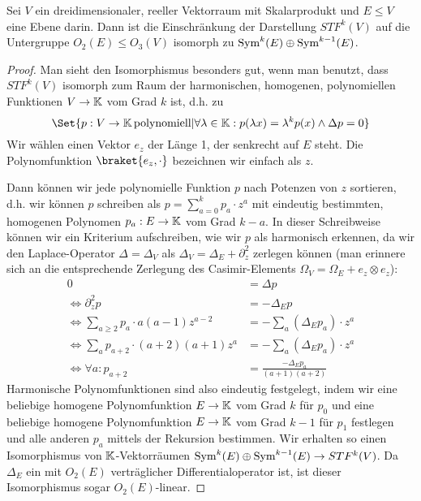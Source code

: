 
\begin{lemma}
Sei $V$ ein dreidimensionaler, reeller Vektorraum mit Skalarprodukt und $E\leq V$ eine Ebene darin. Dann ist die Einschränkung der Darstellung $STF^k(V)$ auf die Untergruppe $O_2(E) \leq O_3(V)$ isomorph zu $\operatorname{Sym}^k(E) \oplus \operatorname{Sym}^{k-1}(E)$.
\end{lemma}
\begin{proof}
Man sieht den Isomorphismus besonders gut, wenn man benutzt, dass $STF^k(V)$ isomorph zum Raum der harmonischen, homogenen, polynomiellen Funktionen $V\to\mathbb{K}$ vom Grad $k$ ist, d.h. zu
\[\Set{p: V\to\IK \,\text{polynomiell} | \forall\lambda\in\IK: p(\lambda x) = \lambda^k p(x) \wedge \Delta p = 0}\]
Wir wählen einen Vektor $e_z$ der Länge 1, der senkrecht auf $E$ steht. Die Polynomfunktion $\braket{e_z,\cdot}$ bezeichnen wir einfach als $z$.

Dann können wir jede polynomielle Funktion $p$ nach Potenzen von $z$ sortieren, d.h. wir können $p$ schreiben als $p = \sum_{a=0}^k p_a \cdot z^a$ mit eindeutig bestimmten, homogenen Polynomen $p_a: E\to\mathbb{K}$ vom Grad $k-a$. In dieser Schreibweise können wir ein Kriterium aufschreiben, wie wir $p$ als harmonisch erkennen, da wir den Laplace-Operator $\Delta=\Delta_V$ als $\Delta_V = \Delta_E + \partial_z^2$ zerlegen können (man erinnere sich an die entsprechende Zerlegung des Casimir-Elements $\Omega_V=\Omega_E + e_z\otimes e_z$):
\begin{align*}
0 &= \Delta p \\
\iff \partial_z^2 p &= -\Delta_ E p \\
\iff \sum_{a\geq 2} p_a \cdot a(a-1)z^{a-2} &= -\sum_a (\Delta_E p_a)\cdot z^a \\
\iff \sum_a p_{a+2}\cdot  (a+2)(a+1)z^a &= -\sum_a (\Delta_E p_a)\cdot z^a \\
\iff \forall a: p_{a+2} &= \frac{-\Delta_E p_a}{(a+1)(a+2)}
\end{align*}
Harmonische Polynomfunktionen sind also eindeutig festgelegt, indem wir eine beliebige homogene Polynomfunktion $E\to\mathbb{K}$ vom Grad $k$ für $p_0$ und eine beliebige homogene Polynomfunktion $E\to\mathbb{K}$ vom Grad $k-1$ für $p_1$ festlegen und alle anderen $p_a$ mittels der Rekursion bestimmen. Wir erhalten so einen Isomorphismus von $\mathbb{K}$-Vektorräumen $\operatorname{Sym}^k(E) \oplus \operatorname{Sym}^{k-1}(E) \to STF^k(V)$. Da $\Delta_E$ ein mit $O_2(E)$ verträglicher Differentialoperator ist, ist dieser Isomorphismus sogar $O_2(E)$-linear.
\end{proof}

